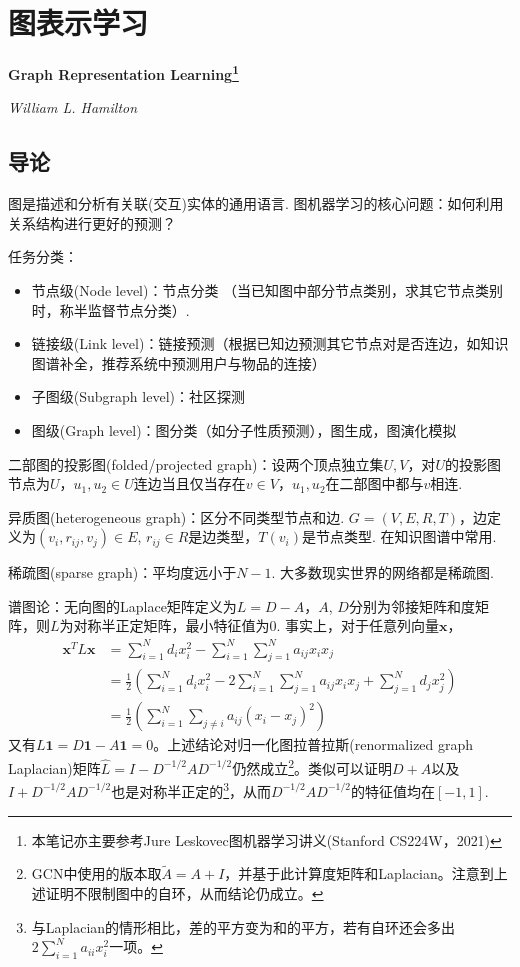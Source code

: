 
\chapter{图表示学习}
\Large\textbf{Graph Representation Learning\footnote{本笔记亦主要参考Jure Leskovec图机器学习讲义(Stanford CS224W，2021)}}
\par \emph{William L. Hamilton} \normalsize

\section{导论}

\par 图是描述和分析有关联(交互)实体的通用语言. 图机器学习的核心问题：如何利用关系结构进行更好的预测？

\par 任务分类：
\begin{itemize}
    \item 节点级(Node level)：节点分类 （当已知图中部分节点类别，求其它节点类别时，称半监督节点分类）. 
    \item 链接级(Link level)：链接预测（根据已知边预测其它节点对是否连边，如知识图谱补全，推荐系统中预测用户与物品的连接）
    \item 子图级(Subgraph level)：社区探测
    \item 图级(Graph level)：图分类（如分子性质预测），图生成，图演化模拟
\end{itemize}

\par 二部图的投影图(folded/projected graph)：设两个顶点独立集$U,V$，对$U$的投影图节点为$U$，$u_1,u_2\in U$连边当且仅当存在$v\in V$，$u_1,u_2$在二部图中都与$v$相连. 

\par 异质图(heterogeneous graph)：区分不同类型节点和边.  $G=(V,E,R,T)$，边定义为$(v_i,r_{ij},v_j)\in E$, $r_{ij}\in R$是边类型，$T(v_i)$是节点类型. 在知识图谱中常用. 

\par 稀疏图(sparse graph)：平均度远小于$N-1$. 大多数现实世界的网络都是稀疏图.

\par 谱图论：无向图的Laplace矩阵定义为$L=D-A$，$A$, $D$分别为邻接矩阵和度矩阵，则$L$为对称半正定矩阵，最小特征值为0. 事实上，对于任意列向量$\mathbf{x}$，
\begin{align}
\mathbf{x}^TL\mathbf{x}&=\sum_{i=1}^N d_ix_i^2-\sum_{i=1}^N\sum_{j=1}^N a_{ij}x_ix_j\\
&=\frac{1}{2}\left(\sum_{i=1}^N d_ix_i^2-2\sum_{i=1}^N\sum_{j=1}^N a_{ij}x_ix_j+\sum_{j=1}^N d_jx_j^2\right)\\
&=\frac{1}{2}\left(\sum_{i=1}^N \sum_{j\neq i}a_{ij}(x_i-x_j)^2\right)
\end{align}
又有$L\mathbf{1}=D\mathbf{1}-A\mathbf{1}=0$。上述结论对归一化图拉普拉斯(renormalized graph Laplacian)矩阵$\hat{L}=I-D^{-1/2}AD^{-1/2}$仍然成立\footnote{GCN中使用的版本取$\tilde{A}=A+I$，并基于此计算度矩阵和Laplacian。注意到上述证明不限制图中的自环，从而结论仍成立。}。类似可以证明$D+A$以及$I+D^{-1/2}AD^{-1/2}$也是对称半正定的\footnote{与Laplacian的情形相比，差的平方变为和的平方，若有自环还会多出$2\sum_{i=1}^N a_{ii}x_i^2$一项。}，从而$D^{-1/2}AD^{-1/2}$的特征值均在$[-1,1]$.

